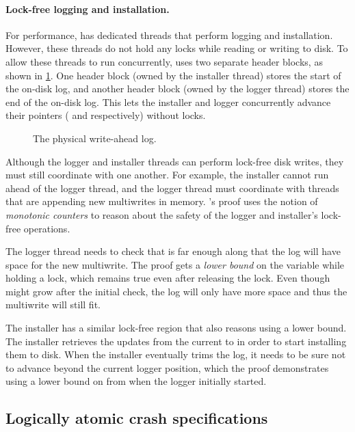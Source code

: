 \paragraph{Lock-free logging and installation.}
For performance, \txn has dedicated threads that perform logging and
installation.  However, these threads do not hold any locks while reading
or writing to disk.  To allow these threads to run concurrently, \txn
uses two separate header blocks, as shown in \cref{fig:physlog}.
One header block (owned by the installer thread) stores the start of
the on-disk log, and another header block (owned by the logger thread)
stores the end of the on-disk log.  This lets the installer and logger
concurrently advance their pointers ( and 
respectively) without locks.

\begin{figure}
    \centering
    
    \caption{The physical write-ahead log.}
    \label{fig:physlog}
\end{figure}

Although the logger and installer threads can perform lock-free disk
writes, they must still coordinate with one another.  For example,
the installer cannot run ahead of the logger thread, and the logger
thread must coordinate with threads that are appending new multiwrites
in memory. \txn's proof uses the notion of \emph{monotonic counters} to reason
about the safety of the logger and installer's lock-free operations.

The logger thread needs to check that  is far enough along that the
log will have space for the new multiwrite. The proof gets a \emph{lower bound}
on the  variable while holding a lock, which remains true even
after releasing the lock. Even though  might grow after the initial
check, the log will only have more space and thus the multiwrite will still fit.

The installer has a similar lock-free region that also reasons using a lower
bound. The installer retrieves the updates from the current  to
 in order to start installing them to disk. When the installer
eventually trims the log, it needs to be sure not to advance beyond the current
logger position, which the proof demonstrates using a lower bound on
 from when the logger initially started.

\subsection{Logically atomic crash specifications}
\label{s:proof:logatom}

